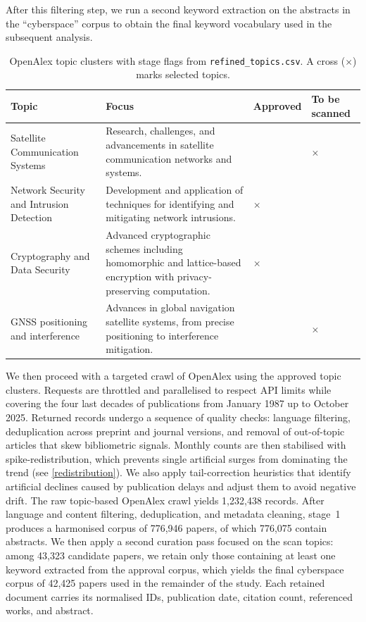 \documentclass[pdflatex,sn-basic]{sn-jnl}
\begin{document}
After this filtering step, we run a second keyword extraction on the abstracts in the ``cyberspace'' corpus to obtain the final keyword vocabulary used in the subsequent analysis.
\begin{table}[H]
\centering
\caption{OpenAlex topic clusters with stage flags from \texttt{refined\_topics.csv}. A cross (\(\times\)) marks selected topics.}
\label{tab:topics}
\begin{tabularx}{\textwidth}{@{}p{}X>{\centering\arraybackslash}p{}>{\centering\arraybackslash}p{}@{}}
\toprule
\textbf{Topic} & \textbf{Focus} & \textbf{Approved} & \textbf{To be scanned} \\
\midrule
Satellite Communication Systems & Research, challenges, and advancements in satellite communication networks and systems. &  & \(\times\) \\
\midrule
Network Security and Intrusion Detection & Development and application of techniques for identifying and mitigating network intrusions. & \(\times\) &  \\
\midrule
Cryptography and Data Security & Advanced cryptographic schemes including homomorphic and lattice-based encryption with privacy-preserving computation. & \(\times\) &  \\
\midrule
GNSS positioning and interference & Advances in global navigation satellite systems, from precise positioning to interference mitigation. &  & \(\times\) \\
\bottomrule
\end{tabularx}
\end{table}

We then proceed with a targeted crawl of OpenAlex using the approved topic clusters.
Requests are throttled and parallelised to respect API limits while covering the four last decades of publications from January 1987 up to October 2025.
Returned records undergo a sequence of quality checks: language filtering, deduplication across preprint and journal versions, and removal of out-of-topic articles that skew bibliometric signals.
Monthly counts are then stabilised with spike-redistribution, which prevents single artificial surges from dominating the trend (see \ref{redistribution}).
We also apply tail-correction heuristics that identify artificial declines caused by publication delays and adjust them to avoid negative drift.
The raw topic-based OpenAlex crawl yields 1,232,438 records. After language and content filtering, deduplication, and metadata cleaning, stage~1 produces a harmonised corpus of 776,946 papers, of which 776,075 contain abstracts. We then apply a second curation pass focused on the scan topics: among 43,323 candidate papers, we retain only those containing at least one keyword extracted from the approval corpus, which yields the final cyberspace corpus of 42,425 papers used in the remainder of the study. Each retained document carries its normalised IDs, publication date, citation count, referenced works, and abstract.
\end{document}
